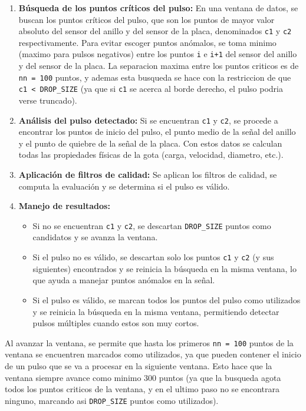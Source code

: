 \documentclass[12pt,a4paper]{article}
\begin{document}
\begin{enumerate}
    \item \textbf{Búsqueda de los puntos críticos del pulso:} En una ventana de datos, se buscan los puntos críticos del pulso, que son los puntos de mayor valor absoluto del sensor del anillo y del sensor de la placa, denominados \texttt{c1} y \texttt{c2} respectivamente. Para evitar escoger puntos anómalos, se toma minimo (maximo para pulsos negativos) entre los puntos \texttt{i} e \texttt{i+1} del sensor del anillo y del sensor de la placa. La separacion maxima entre los puntos criticos es de \texttt{nn = 100} puntos, y ademas esta busqueda se hace con la restriccion de que \texttt{c1 <\ DROP\_SIZE} (ya que si \texttt{c1} se acerca al borde derecho, el pulso podria verse truncado).
    
    \item \textbf{Análisis del pulso detectado:} Si se encuentran \texttt{c1} y \texttt{c2}, se procede a encontrar los puntos de inicio del pulso, el punto medio de la señal del anillo y el punto de quiebre de la señal de la placa. Con estos datos se calculan todas las propiedades físicas de la gota (carga, velocidad, diametro, etc.).
    
    \item \textbf{Aplicación de filtros de calidad:} Se aplican los filtros de calidad, se computa la evaluación y se determina si el pulso es válido.
    
    \item \textbf{Manejo de resultados:} 
    \begin{itemize}
        \item Si no se encuentran \texttt{c1} y \texttt{c2}, se descartan \texttt{DROP\_SIZE} puntos como candidatos y se avanza la ventana.
        \item Si el pulso no es válido, se descartan solo los puntos \texttt{c1} y \texttt{c2} (y sus siguientes) encontrados y se reinicia la búsqueda en la misma ventana, lo que ayuda a manejar puntos anómalos en la señal.
        \item Si el pulso es válido, se marcan todos los puntos del pulso como utilizados y se reinicia la búsqueda en la misma ventana, permitiendo detectar pulsos múltiples cuando estos son muy cortos.
    \end{itemize}
\end{enumerate}

Al avanzar la ventana, se permite que hasta los primeros \texttt{nn = 100} puntos de la ventana se encuentren marcados como utilizados, ya que pueden contener el inicio de un pulso que se va a procesar en la siguiente ventana. Esto hace que la ventana siempre avance como minimo 300 puntos (ya que la busqueda agota todos los puntos criticos de la ventana, y en el ultimo paso no se encontrara ninguno, marcando asi \texttt{DROP\_SIZE} puntos como utilizados).
\end{document}
